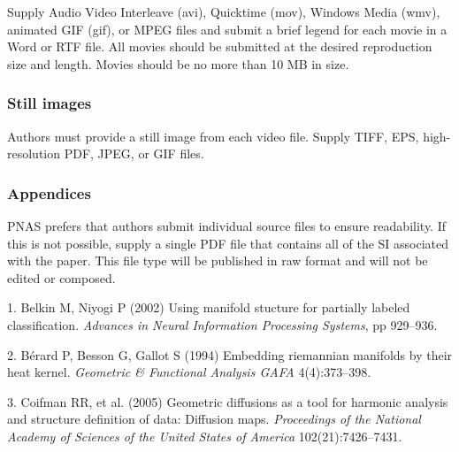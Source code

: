 \documentclass[9pt,twocolumn,twoside,]{pnas-new}
\begin{document}
Supply Audio Video Interleave (avi), Quicktime (mov), Windows Media
(wmv), animated GIF (gif), or MPEG files and submit a brief legend for
each movie in a Word or RTF file. All movies should be submitted at the
desired reproduction size and length. Movies should be no more than 10
MB in size.

\subsubsection*{Still images}\label{still-images}

Authors must provide a still image from each video file. Supply TIFF,
EPS, high-resolution PDF, JPEG, or GIF files.

\subsubsection*{Appendices}\label{appendices}

PNAS prefers that authors submit individual source files to ensure
readability. If this is not possible, supply a single PDF file that
contains all of the SI associated with the paper. This file type will be
published in raw format and will not be edited or composed.

\showmatmethods
\showacknow
\pnasbreak

\hypertarget{refs}{}
\hypertarget{ref-belkin2002using}{}
1. Belkin M, Niyogi P (2002) Using manifold stucture for partially
labeled classification. \emph{Advances in Neural Information Processing
Systems}, pp 929--936.

\hypertarget{ref-berard1994embedding}{}
2. Bérard P, Besson G, Gallot S (1994) Embedding riemannian manifolds by
their heat kernel. \emph{Geometric \& Functional Analysis GAFA}
4(4):373--398.

\hypertarget{ref-coifman2005geometric}{}
3. Coifman RR, et al. (2005) Geometric diffusions as a tool for harmonic
analysis and structure definition of data: Diffusion maps.
\emph{Proceedings of the National Academy of Sciences of the United
States of America} 102(21):7426--7431.



% 
\end{document}
